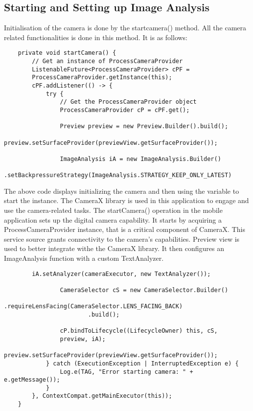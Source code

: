 \documentclass[MScCS]{uccthesis}
\begin{document}
\subsection{Starting and Setting up Image Analysis}
Initialisation of the camera is done by the startcamera() method. All the camera related functionalities is done in this method. It is as follows:
\begin{scriptsize}

\begin{verbatim}
    private void startCamera() {
        // Get an instance of ProcessCameraProvider
        ListenableFuture<ProcessCameraProvider> cPF =
        ProcessCameraProvider.getInstance(this);
        cPF.addListener(() -> {
            try {
                // Get the ProcessCameraProvider object
                ProcessCameraProvider cP = cPF.get();

                Preview preview = new Preview.Builder().build();
                preview.setSurfaceProvider(previewView.getSurfaceProvider());

                ImageAnalysis iA = new ImageAnalysis.Builder()
                        .setBackpressureStrategy(ImageAnalysis.STRATEGY_KEEP_ONLY_LATEST)
\end{verbatim}
\end{scriptsize}

 The above code displays initializing the camera and then using the variable to start the instance. The CameraX library is used in this application to engage and use the camera-related tasks.
The startCamera() operation in the mobile application sets up the digital camera capability. It starts by acquiring a ProcessCameraProvider instance, that is a critical component of CameraX. This service source grants connectivity to the camera's capabilities. Preview view is used to better integrate withe the CameraX library. It then configures an ImageAnalysis function with a custom TextAnalyzer.

\begin{scriptsize}
    \begin{verbatim}
        iA.setAnalyzer(cameraExecutor, new TextAnalyzer());

                CameraSelector cS = new CameraSelector.Builder()
                        .requireLensFacing(CameraSelector.LENS_FACING_BACK)
                        .build();

                cP.bindToLifecycle((LifecycleOwner) this, cS, 
                preview, iA);
                preview.setSurfaceProvider(previewView.getSurfaceProvider());
            } catch (ExecutionException | InterruptedException e) {
                Log.e(TAG, "Error starting camera: " + e.getMessage());
            }
        }, ContextCompat.getMainExecutor(this));
    }
    \end{verbatim}
\end{scriptsize}
\end{document}
